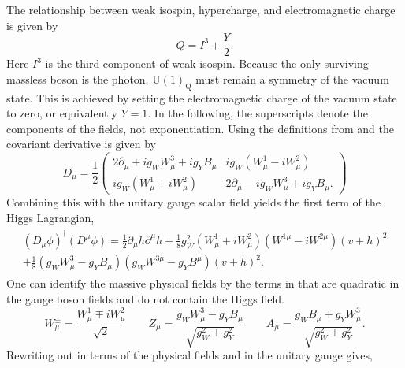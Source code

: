 The relationship between weak isospin, hypercharge, and electromagnetic charge is given by
\begin{equation}
    \label{eq:hypercharge}
    Q = I^3 + \frac{Y}{2}.
\end{equation}
Here $I^3$ is the third component of weak isospin.
Because the only surviving massless boson is the photon, $\text{U}(1)_\text{Q}$ must remain a symmetry of the vacuum state.
This is achieved by setting the electromagnetic charge of the vacuum state to zero, or equivalently $Y=1$.
In the following, the superscripts denote the components of the fields, not exponentiation.
Using the definitions from  and  the covariant derivative is given by
\begin{equation}
    \label{eq:higgs_covariant_derivative}
    D_\mu = \frac{1}{2}
    \begin{pmatrix}
        2 \partial_\mu + i g_W W_\mu^3 + i g_Y B_\mu &
        i g_W (W_\mu^1 - i W_\mu^2)                    \\
        i g_W (W_\mu^1 + i W_\mu^2)                  &
        2 \partial_\mu - i g_W W_\mu^3 + i g_Y B_\mu.
    \end{pmatrix}
\end{equation}
Combining this with the unitary gauge scalar field yields the first term of the Higgs Lagrangian,
\begin{align}
    \label{eq:higgs_lagrangian_1}
    \begin{split}
        (D_\mu \phi)^\dagger (D^\mu \phi) =
        \frac{1}{2} \partial_\mu h \partial^\mu h
        + \frac{1}{8} g_W^2 (W_\mu^1 + i W_\mu^2)(W^{1\mu} - i W^{2\mu})(v + h)^2
        \\
        + \frac{1}{8} (g_W W_\mu^3 - g_Y B_\mu)(g_W W^{3\mu} - g_Y B^\mu)(v + h)^2.
    \end{split}
\end{align}
One can identify the massive physical fields by the terms in  that are quadratic in the gauge boson fields and do not contain the Higgs field.
\begin{equation}
    W^\pm_\mu = \frac{W^1_\mu \mp i W^2_\mu}{\sqrt{2}}
    \qquad
    Z_\mu = \frac{g_W W^3_\mu - g_Y B_\mu}{\sqrt{g_W^2 + g_Y^2}}
    \qquad
    A_\mu = \frac{g_W B_\mu + g_Y W^3_\mu}{\sqrt{g_W^2 + g_Y^2}}.
\end{equation}
Rewriting out  in terms of the physical fields and in the unitary gauge gives,
